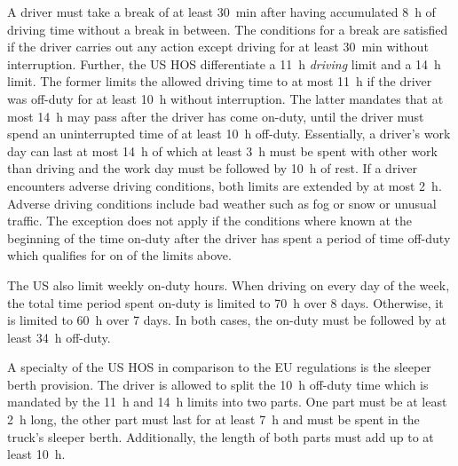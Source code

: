 A driver must take a break of at least \SI{30}{\minute} after having accumulated \SI{8}{\hour} of driving time without a break in between. The conditions for a break are satisfied if the driver carries out any action except driving for at least \SI{30}{\minute} without interruption. Further, the US HOS differentiate a \SI{11}{\hour} \emph{driving} limit and a \SI{14}{\hour} limit. The former limits the allowed driving time to at most \SI{11}{\hour} if the driver was off-duty for at least \SI{10}{\hour} without interruption. The latter mandates that at most \SI{14}{\hour} may pass after the driver has come on-duty, until the driver must spend an uninterrupted time of at least \SI{10}{\hour} off-duty. Essentially, a driver's work day can last at most \SI{14}{\hour} of which at least \SI{3}{\hour} must be spent with other work than driving and the work day must be followed by \SI{10}{\hour} of rest. If a driver encounters adverse driving conditions, both limits are extended by at most \SI{2}{\hour}. Adverse driving conditions include bad weather such as fog or snow or unusual traffic. The exception does not apply if the conditions where known at the beginning of the time on-duty after the driver has spent a period of time off-duty which qualifies for on of the limits above.

The US also limit weekly on-duty hours. When driving on every day of the week, the total time period spent on-duty is limited to \SI{70}{\hour} over 8 days. Otherwise, it is limited to \SI{60}{\hour} over 7 days. In both cases, the on-duty must be followed by at least \SI{34}{\hour} off-duty.

A specialty of the US HOS in comparison to the EU regulations is the sleeper berth provision. The driver is allowed to split the \SI{10}{\hour} off-duty time which is mandated by the \SI{11}{\hour} and \SI{14}{\hour} limits into two parts. One part must be at least \SI{2}{\hour} long, the other part must last for at least \SI{7}{\hour} and must be spent in the truck's sleeper berth. Additionally, the length of both parts must add up to at least \SI{10}{\hour}.

